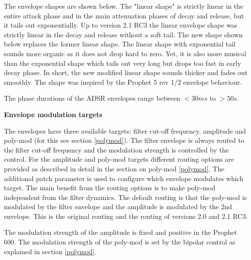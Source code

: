  The envelope shapes are shown below. The "linear shape" is strictly linear in the entire attack phase and in the main attenuation phases of decay and release, but it tails out exponentially. Up to version 2.1 RC3 the linear envelope shape was strictly linear in the decay and release without a soft tail. The new shape shown below replaces the former linear shape. The linear shape with exponential tail sounds more organic as it does not drop hard to zero. Yet, it is also more musical than the exponential shape which tails out very long but drops too fast in early decay phase. In short, the new modified linear shape sounds thicker and fades out smoothly. The shape was inspired by the Prophet 5 rev 1/2 envelope behaviour. 
 

The phase durations of the ADSR envelopes range between $<30 ms$ to $>50 s$.

\textbf{Envelope modulation targets}
 
The envelopes have three available targets: filter cut-off frequency, amplitude and poly-mod (for this see section \ref{polymod}). The filter envelope is always routed to the filter cut-off frequency and the modulation strength is controlled by the \filenv control. For the  amplitude and poly-mod targets different routing options are provided as described in detail in the section on poly-mod \ref{polymod}. The additional patch parameter \envrouting is used to configure which envelope modulates which target. The main benefit from the routing options is to make poly-mod independent from the filter dynamics. The default routing is that the poly-mod is modulated by the filter envelope and the amplitude is modulated by the 2nd envelope. This is the original routing and the routing of versions 2.0 and 2.1 RC3. 

The modulation strength of the amplitude is fixed and positive in the Prophet 600. The modulation strength of the poly-mod is set by the bipolar \polymodenv control as explained in section \ref{polymod}. 
